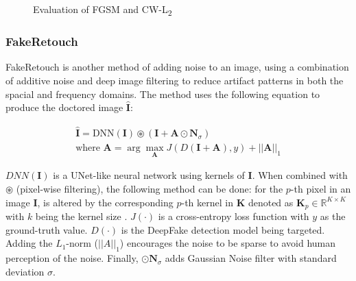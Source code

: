 \documentclass{article}
\begin{document}
\begin{figure}[H]
    \centering
    \caption{Evaluation of FGSM and CW-L\textsubscript{2}}
    \label{fig:fgsm}
\end{figure}

\subsubsection{FakeRetouch}

FakeRetouch is another method of adding noise to an image, using a combination of additive noise and deep image filtering to reduce artifact patterns in both the spacial and frequency domains\cite{huang2020fakeretouch}. The method uses the following equation to produce the doctored image $\hat{\mathbf{I}}$:

\begin{equation}
\begin{array}{c}
    \hat{\mathbf{I}}=\text{DNN}(\mathbf{I})\circledast (\mathbf{I} +\mathbf{A}\odot \mathbf{N}_{\sigma}) \\
    \text{where }\mathbf{A}=\arg \max _{\mathbf{A}}J(D(\mathbf{I}+\mathbf{A}), y) +||\mathbf{A}||_1
\end{array}
\end{equation}

$DNN(\mathbf{I})$ is a UNet-like neural network using kernels of $\mathbf{I}$. When combined with $\circledast$ (pixel-wise filtering), the following method can be done: for the $p$-th pixel in an image $\mathbf{I}$, is altered by the corresponding $p$-th kernel in $\mathbf{K}$ denoted as $\textbf{K}_p \in \mathbb{R}^{K \times K}$ with $k$ being the kernel size \cite{huang2020fakeretouch}. $J(\cdot)$ is a cross-entropy loss function with $y$ as the ground-truth value. $D(\cdot)$ is the DeepFake detection model being targeted. Adding the $L_1$-norm ($||A||_1$) encourages the noise to be sparse to avoid human perception of the noise. Finally, $\odot \mathbf{N}_\sigma$ adds Gaussian Noise filter with standard deviation $\sigma$. \\
\end{document}
